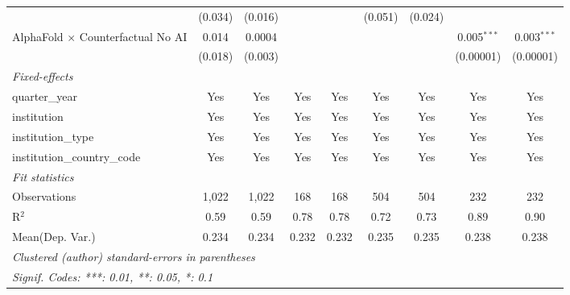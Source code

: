 \begin{tabular}{lcccccccc}
                                            & (0.034) & (0.016) &         &         & (0.051) & (0.024) &                &   \\   
   AlphaFold $\times$ Counterfactual No AI  & 0.014   & 0.0004  &         &         &         &         & 0.005$^{***}$  & 0.003$^{***}$\\   
                                            & (0.018) & (0.003) &         &         &         &         & (0.00001)      & (0.00001)\\   
   \midrule
   \emph{Fixed-effects}\\
   quarter\_year                            & Yes     & Yes     & Yes     & Yes     & Yes     & Yes     & Yes            & Yes\\  
   institution                              & Yes     & Yes     & Yes     & Yes     & Yes     & Yes     & Yes            & Yes\\  
   institution\_type                        & Yes     & Yes     & Yes     & Yes     & Yes     & Yes     & Yes            & Yes\\  
   institution\_country\_code               & Yes     & Yes     & Yes     & Yes     & Yes     & Yes     & Yes            & Yes\\  
   \midrule
   \emph{Fit statistics}\\
   Observations                             & 1,022   & 1,022   & 168     & 168     & 504     & 504     & 232            & 232\\  
   R$^2$                                    & 0.59    & 0.59    & 0.78    & 0.78    & 0.72    & 0.73    & 0.89           & 0.90\\  
Mean(Dep. Var.) & 0.234 & 0.234 & 0.232 & 0.232 & 0.235 & 0.235 & 0.238 & 0.238 \\
   \midrule \midrule
   \multicolumn{9}{l}{\emph{Clustered (author) standard-errors in parentheses}}\\
   \multicolumn{9}{l}{\emph{Signif. Codes: ***: 0.01, **: 0.05, *: 0.1}}\\
\end{tabular}
\par\endgroup
